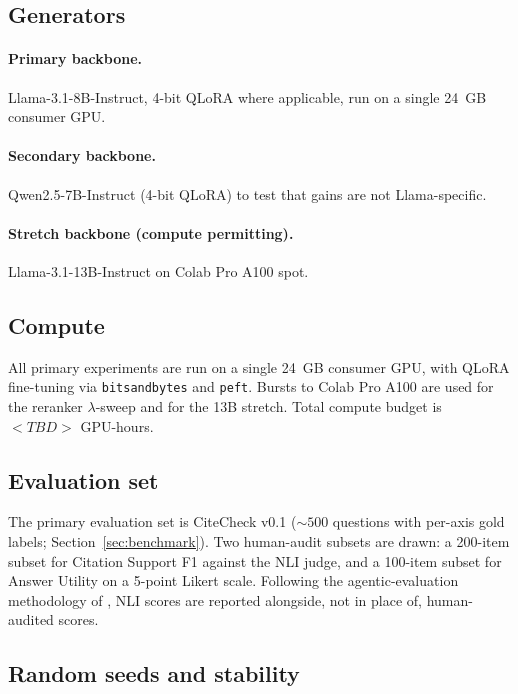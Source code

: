 \documentclass[11pt]{article}
\begin{document}
\subsection{Generators}
\label{sec:setup:generators}

\paragraph{Primary backbone.}
Llama-3.1-8B-Instruct, 4-bit QLoRA where applicable, run on a single
24~GB consumer GPU.

\paragraph{Secondary backbone.}
Qwen2.5-7B-Instruct (4-bit QLoRA) to test that gains are not
Llama-specific.

\paragraph{Stretch backbone (compute permitting).}
Llama-3.1-13B-Instruct on Colab Pro A100 spot.

\subsection{Compute}
\label{sec:setup:compute}

All primary experiments are run on a single 24~GB consumer GPU, with
QLoRA fine-tuning via \texttt{bitsandbytes} and \texttt{peft}. Bursts
to Colab Pro A100 are used for the reranker $\lambda$-sweep and for
the 13B stretch. Total compute budget is $<TBD>$ GPU-hours.

\subsection{Evaluation set}
\label{sec:setup:evalset}

The primary evaluation set is CiteCheck v0.1 (${\sim}500$ questions
with per-axis gold labels; Section~\ref{sec:benchmark}). Two
human-audit subsets are drawn: a 200-item subset for Citation Support
F1 against the NLI judge, and a 100-item subset for Answer Utility
on a 5-point Likert scale. Following the agentic-evaluation
methodology of \citet{gao2025ragalyst}, NLI scores are reported
alongside, not in place of, human-audited scores.

\subsection{Random seeds and stability}
\label{sec:setup:seeds}
\end{document}
